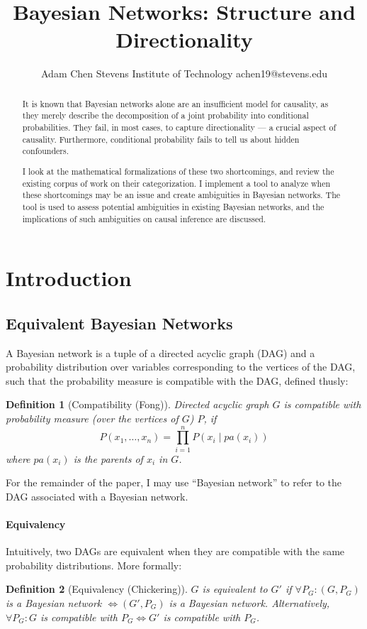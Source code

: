 \documentclass{article}
\title{Bayesian Networks: Structure and Directionality}
\author{
	Adam Chen
	\affiliations
	Stevens Institute of Technology
	\emails
	achen19@stevens.edu
}
\newtheorem{definition}{Definition}
\begin{document}
	
	\maketitle
	
	\begin{abstract}
		It is known that Bayesian networks alone are an insufficient model for causality, as they merely describe the decomposition of a joint probability into conditional probabilities.
		They fail, in most cases, to capture directionality --- a crucial aspect of causality.
		Furthermore, conditional probability fails to tell us about hidden confounders.
		
		I look at the mathematical formalizations of these two shortcomings, and review the existing corpus of work on their categorization.
		I implement a tool to analyze when these shortcomings may be an issue and create ambiguities in Bayesian networks.
		The tool is used to assess potential ambiguities in existing Bayesian networks, and the implications of such ambiguities on causal inference are discussed.
	\end{abstract}
	
		
	\section{Introduction}
	\subsection{Equivalent Bayesian Networks}
	A Bayesian network is a tuple of a directed acyclic graph (DAG) and a probability distribution over variables corresponding to the vertices of the DAG, such that the probability measure is compatible with the DAG, defined thusly:
	\begin{definition}[Compatibility (Fong)\cite{fong2013causal}]
		Directed acyclic graph $G$ is compatible with probability measure (over the vertices of $G$) $P$, if
		$$
		P(x_1, \dots, x_n) = \prod_{i=1}^n{P(x_i \mid pa(x_i))}
		$$
		where $pa(x_i)$ is the parents of $x_i$ in $G$.
	\end{definition}
	For the remainder of the paper, I may use ``Bayesian network'' to refer to the DAG associated with a Bayesian network.
	
	\paragraph{Equivalency} Intuitively, two DAGs are equivalent when they are compatible with the same probability distributions. More formally:
	\begin{definition}[Equivalency (Chickering)\cite{chickering2013transformational}]
		$G$ is equivalent to $G'$ if $\forall P_G: (G, P_G)$ is a Bayesian network $\iff (G', P_G)$ is a Bayesian network.
		Alternatively, $\forall P_G: G$ is compatible with $P_G \iff G'$ is compatible with $P_G$.
	\end{definition}
	
\end{document}
